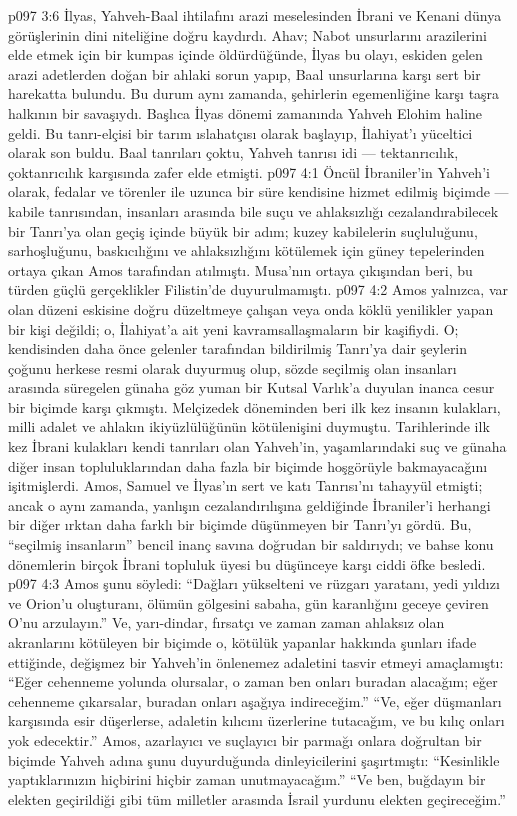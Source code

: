 \vs p097 3:6 İlyas, Yahveh\hyp{}Baal ihtilafını arazi meselesinden İbrani ve Kenani dünya görüşlerinin dini niteliğine doğru kaydırdı. Ahav; Nabot unsurlarını arazilerini elde etmek için bir kumpas içinde öldürdüğünde, İlyas bu olayı, eskiden gelen arazi adetlerden doğan bir ahlaki sorun yapıp, Baal unsurlarına karşı sert bir harekatta bulundu. Bu durum aynı zamanda, şehirlerin egemenliğine karşı taşra halkının bir savaşıydı. Başlıca İlyas dönemi zamanında Yahveh Elohim haline geldi. Bu tanrı\hyp{}elçisi bir tarım ıslahatçısı olarak başlayıp, İlahiyat’ı yüceltici olarak son buldu. Baal tanrıları çoktu, Yahveh tanrısı  idi --- tektanrıcılık, çoktanrıcılık karşısında zafer elde etmişti.
\vs p097 4:1 Öncül İbraniler’in Yahveh’i olarak, fedalar ve törenler ile uzunca bir süre kendisine hizmet edilmiş biçimde --- kabile tanrısından, insanları arasında bile suçu ve ahlaksızlığı cezalandırabilecek bir Tanrı’ya olan geçiş içinde büyük bir adım; kuzey kabilelerin suçluluğunu, sarhoşluğunu, baskıcılığını ve ahlaksızlığını kötülemek için güney tepelerinden ortaya çıkan Amos tarafından atılmıştı. Musa’nın ortaya çıkışından beri, bu türden güçlü gerçeklikler Filistin’de duyurulmamıştı.
\vs p097 4:2 Amos yalnızca, var olan düzeni eskisine doğru düzeltmeye çalışan veya onda köklü yenilikler yapan bir kişi değildi; o, İlahiyat’a ait yeni kavramsallaşmaların bir kaşifiydi. O; kendisinden daha önce gelenler tarafından bildirilmiş Tanrı’ya dair şeylerin çoğunu herkese resmi olarak duyurmuş olup, sözde seçilmiş olan insanları arasında süregelen günaha göz yuman bir Kutsal Varlık’a duyulan inanca cesur bir biçimde karşı çıkmıştı. Melçizedek döneminden beri ilk kez insanın kulakları, milli adalet ve ahlakın ikiyüzlülüğünün kötülenişini duymuştu. Tarihlerinde ilk kez İbrani kulakları kendi tanrıları olan Yahveh’in, yaşamlarındaki suç ve günaha diğer insan topluluklarından daha fazla bir biçimde hoşgörüyle bakmayacağını işitmişlerdi. Amos, Samuel ve İlyas’ın sert ve katı Tanrısı’nı tahayyül etmişti; ancak o aynı zamanda, yanlışın cezalandırılışına geldiğinde İbraniler’i herhangi bir diğer ırktan daha farklı bir biçimde düşünmeyen bir Tanrı’yı gördü. Bu, “seçilmiş insanların” bencil inanç savına doğrudan bir saldırıydı; ve bahse konu dönemlerin birçok İbrani topluluk üyesi bu düşünceye karşı ciddi öfke besledi.
\vs p097 4:3 Amos şunu söyledi: “Dağları yükselteni ve rüzgarı yaratanı, yedi yıldızı ve Orion’u oluşturanı, ölümün gölgesini sabaha, gün karanlığını geceye çeviren O’nu arzulayın.” Ve, yarı\hyp{}dindar, fırsatçı ve zaman zaman ahlaksız olan akranlarını kötüleyen bir biçimde o, kötülük yapanlar hakkında şunları ifade ettiğinde, değişmez bir Yahveh’in önlenemez adaletini tasvir etmeyi amaçlamıştı: “Eğer cehenneme yolunda olursalar, o zaman ben onları buradan alacağım; eğer cehenneme çıkarsalar, buradan onları aşağıya indireceğim.” “Ve, eğer düşmanları karşısında esir düşerlerse, adaletin kılıcını üzerlerine tutacağım, ve bu kılıç onları yok edecektir.” Amos, azarlayıcı ve suçlayıcı bir parmağı onlara doğrultan bir biçimde Yahveh adına şunu duyurduğunda dinleyicilerini şaşırtmıştı: “Kesinlikle yaptıklarınızın hiçbirini hiçbir zaman unutmayacağım.” “Ve ben, buğdayın bir elekten geçirildiği gibi tüm milletler arasında İsrail yurdunu elekten geçireceğim.”
